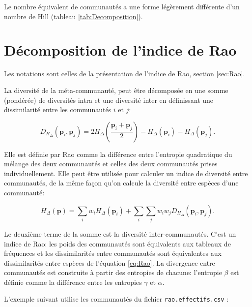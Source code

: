 \documentclass[
  11pt,
  french,
  a4paper,
  extrafontsizes,onecolumn,openright
  ]{memoir}
\begin{document}
\normalsize

Le nombre équivalent de communautés a une forme légèrement différente d'un nombre de Hill (tableau \ref{tab:Decomposition}).

\hypertarget{sec:RaoDisc}{%
\section{Décomposition de l'indice de Rao}\label{sec:RaoDisc}}

Les notations sont celles de la présentation de l'indice de Rao, section \ref{sec:Rao}.

La diversité de la méta-communauté, peut être décomposée en une somme (pondérée) de diversités intra et une diversité inter \autocite{Pavoine2004} en définissant une dissimilarité entre les communautés \(i\) et \(j\):

\begin{equation}
  \label{eq:DHdelta}
  D_{H_{\Delta }}\left(\mathbf{p}_i,\mathbf{p}_j\right)
  = 2 H_{\Delta}\left(\frac{\mathbf{p}_{i}+\mathbf{p}_j}{2}\right)
  -H_{\Delta}\left(\mathbf{p}_i\right)-H_{\Delta}\left(\mathbf{p}_j\right).
\end{equation}

Elle est définie par Rao comme la différence entre l'entropie quadratique du mélange des deux communautés et celles des deux communautés prises individuellement.
Elle peut être utilisée pour calculer un indice de diversité entre communautés, de la même façon qu'on calcule la diversité entre espèces d'une communauté:

\begin{equation}
  \label{eq:Raobeta}
  H_{\Delta }\left(\mathbf{p}\right) = \sum_i{w_i H_{\Delta }\left({\mathbf{p}}_i\right)}+\sum_i{\sum_j{w_i w_j D_{H_{\Delta }}\left({\mathbf{p}}_i,{\mathbf{p}}_j\right)}}.
\end{equation}

Le deuxième terme de la somme est la diversité inter-communautés.
C'est un indice de Rao: les poids des communautés sont équivalents aux tableaux de fréquences et les dissimilarités entre communautés sont équivalentes aux dissimilarités entre espèces de l'équation \eqref{eq:Rao}.
La divergence entre communautés est construite à partir des entropies de chacune: l'entropie \(\beta\) est définie comme la différence entre les entropies \(\gamma\) et \(\alpha\).

L'exemple suivant utilise les communautés du fichier \texttt{rao.effectifs.csv} :
\end{document}
